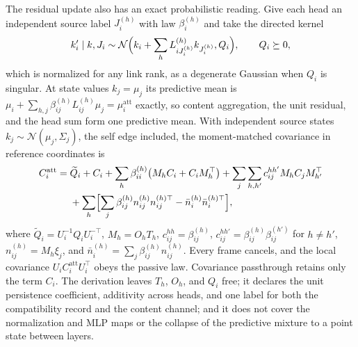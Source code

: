 \documentclass[twoside,11pt]{article}
\begin{document}
The residual update also has an exact probabilistic reading. Give each head an independent source label $J_i^{(h)}$ with law $\beta_i^{(h)}$ and take the directed kernel
\begin{equation}
k_i'\mid k,J_i\sim\mathcal N\Bigl(k_i+\sum_hL_{iJ_i^{(h)}}^{(h)}k_{J_i^{(h)}},Q_i\Bigr),\qquad Q_i\succeq0,
\label{eq:predictive_kernel}
\end{equation}
which is normalized for any link rank, as a degenerate Gaussian when $Q_i$ is singular. At state values $k_j=\mu_j$ its predictive mean is $\mu_i+\sum_{h,j}\beta_{ij}^{(h)}L_{ij}^{(h)}\mu_j=\mu_i^{\mathrm{att}}$ exactly, so content aggregation, the unit residual, and the head sum form one predictive mean. With independent source states $k_j\sim\mathcal N(\mu_j,\Sigma_j)$, the self edge included, the moment-matched covariance in reference coordinates is
\begin{equation}
\begin{aligned}
C_i^{\mathrm{att}}={}&\widetilde Q_i+C_i+\sum_h\beta_{ii}^{(h)}\bigl(M_hC_i+C_iM_h^\top\bigr)
+\sum_j\sum_{h,h'}c_{ij}^{hh'}M_hC_jM_{h'}^\top\\
&+\sum_h\Bigl[\sum_j\beta_{ij}^{(h)}n_{ij}^{(h)}n_{ij}^{(h)\top}-\bar n_i^{(h)}\bar n_i^{(h)\top}\Bigr],
\end{aligned}
\label{eq:predictive_kernel_covariance}
\end{equation}
where $\widetilde Q_i=U_i^{-1}Q_iU_i^{-\top}$, $M_h=O_hT_h$, $c_{ij}^{hh}=\beta_{ij}^{(h)}$, $c_{ij}^{hh'}=\beta_{ij}^{(h)}\beta_{ij}^{(h')}$ for $h\ne h'$, $n_{ij}^{(h)}=M_h\xi_j$, and $\bar n_i^{(h)}=\sum_j\beta_{ij}^{(h)}n_{ij}^{(h)}$. Every frame cancels, and the local covariance $U_iC_i^{\mathrm{att}}U_i^\top$ obeys the passive law. Covariance passthrough retains only the term $C_i$. The derivation leaves $T_h$, $O_h$, and $Q_i$ free; it declares the unit persistence coefficient, additivity across heads, and one label for both the compatibility record and the content channel; and it does not cover the normalization and MLP maps or the collapse of the predictive mixture to a point state between layers.
\end{document}
